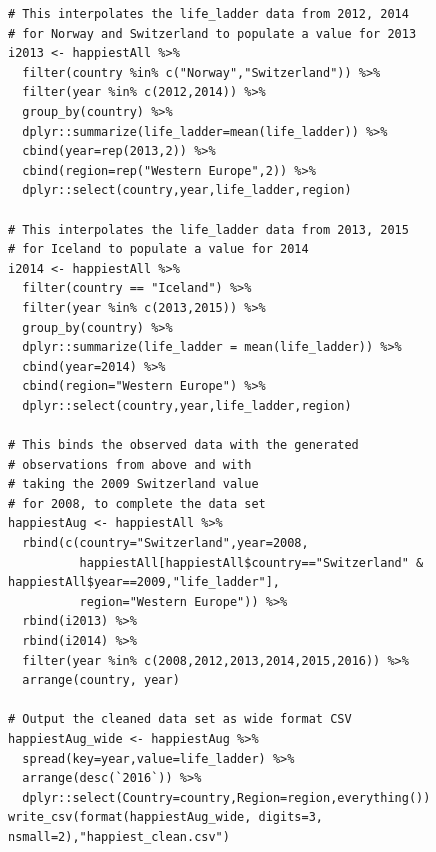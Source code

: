 \documentclass{article}
\begin{document}
\begin{verbatim}
# This interpolates the life_ladder data from 2012, 2014
# for Norway and Switzerland to populate a value for 2013
i2013 <- happiestAll %>%
  filter(country %in% c("Norway","Switzerland")) %>%
  filter(year %in% c(2012,2014)) %>%
  group_by(country) %>%
  dplyr::summarize(life_ladder=mean(life_ladder)) %>%
  cbind(year=rep(2013,2)) %>%
  cbind(region=rep("Western Europe",2)) %>%
  dplyr::select(country,year,life_ladder,region)

# This interpolates the life_ladder data from 2013, 2015
# for Iceland to populate a value for 2014
i2014 <- happiestAll %>%
  filter(country == "Iceland") %>%
  filter(year %in% c(2013,2015)) %>%
  group_by(country) %>%
  dplyr::summarize(life_ladder = mean(life_ladder)) %>%
  cbind(year=2014) %>%
  cbind(region="Western Europe") %>%
  dplyr::select(country,year,life_ladder,region)
  
# This binds the observed data with the generated
# observations from above and with 
# taking the 2009 Switzerland value
# for 2008, to complete the data set
happiestAug <- happiestAll %>% 
  rbind(c(country="Switzerland",year=2008,
          happiestAll[happiestAll$country=="Switzerland" & happiestAll$year==2009,"life_ladder"],
          region="Western Europe")) %>%
  rbind(i2013) %>%
  rbind(i2014) %>%
  filter(year %in% c(2008,2012,2013,2014,2015,2016)) %>%
  arrange(country, year)

# Output the cleaned data set as wide format CSV
happiestAug_wide <- happiestAug %>% 
  spread(key=year,value=life_ladder) %>%
  arrange(desc(`2016`)) %>%
  dplyr::select(Country=country,Region=region,everything())
write_csv(format(happiestAug_wide, digits=3, nsmall=2),"happiest_clean.csv")
\end{verbatim}
\end{document}
